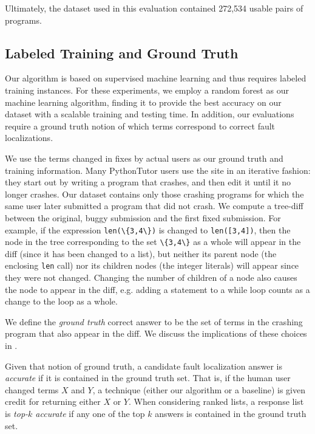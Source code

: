 \documentclass[conference]{IEEEtran}
\newcommand\lt[1]{{\lstinline|#1|}}
\begin{document}
Ultimately, the dataset used in this evaluation contained
272,534 usable pairs of programs.

\subsection{Labeled Training and Ground Truth}
\label{sec-training}

Our algorithm is based on supervised machine learning and thus requires
labeled training instances.  For these experiments, we employ a random
forest as our machine learning algorithm, finding it to provide the best
accuracy on our dataset with a scalable training and testing time.  In
addition, our evaluations require a ground truth notion of which terms
correspond to correct fault localizations.

We use the terms changed in fixes by actual users as our
ground truth and training information.  Many PythonTutor users use the site
in an iterative fashion: they start out by writing a program that crashes,
and then edit it until it no longer crashes. Our dataset contains only
those crashing programs for which the same user later submitted a program
that did not crash. We compute a tree-diff~\cite{tree-diff} between the
original, buggy submission and the first fixed submission. For example,
if the expression \lt{len(\{3,4\})} is changed to \lt{len([3,4])}, then the
node in the tree corresponding to the set \lt{\{3,4\}} as a whole will
appear in the diff (since it has been changed to a list), but neither its parent
node (the enclosing \lt{len} call) nor its children nodes (the integer literals)
will appear since they were not changed. Changing the number of children of a
node also causes the node to appear in the diff, e.g. adding a statement
to a while loop counts as a change to the loop as a whole.

We define the \emph{ground truth} correct answer to be the set of terms in the
crashing program that also appear in the diff. We discuss the implications
of these choices in .

Given that notion of ground truth, a candidate fault localization answer is
\emph{accurate} if it is contained in the ground truth set. That is, if the
human user changed terms $X$ and $Y$, a technique (either our algorithm
or a baseline) is given credit for returning either $X$ or $Y$. When
considering ranked lists, a response list is \emph{top-$k$ accurate} if any one
of the top $k$ answers is contained in the ground truth set.
\end{document}
